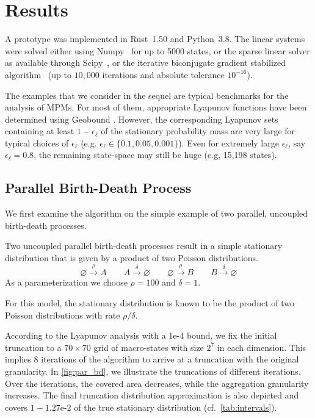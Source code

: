\section{Results}\label{sec:statagg:results}
A prototype was implemented in Rust~1.50 and Python~3.8.
The linear systems were solved either using Numpy~\cite{numpy} for up to 5000 states, or the sparse linear solver as available through Scipy~\cite{2020SciPy-NMeth}, or the iterative biconjugate gradient stabilized algorithm~\cite{van1992bi} (up to $10,\!000$ iterations and absolute tolerance $10^{-16}$).

The examples that we consider in the sequel 
are typical benchmarks for the analysis of \acp{MPM}. For most of them, appropriate Lyapunov functions
have been determined using Geobound \cite{spieler2014numerical}.
However, the corresponding Lyapunov sets containing at least $1-\epsilon_{\ell}$ of the stationary probability mass are very large for typical choices of $\epsilon_{\ell}$ (e.g. $\epsilon_{\ell}\in \{0.1,0.05,0.001\}$). Even
for extremely large $\epsilon_{\ell}$, say $\epsilon_{\ell}=0.8$, the remaining state-space may still be huge (e.g, 15,198 states).
\subsection{Parallel Birth-Death Process}
We first examine the algorithm on the simple example of two parallel, uncoupled birth-death processes.
\begin{model}\label{model:par_bd}
Two uncoupled parallel birth-death processes result in a simple stationary distribution that is
given by a product of two Poisson distributions.
$$\varnothing\xrightarrow{\rho} A \qquad A\xrightarrow{\delta} \varnothing \qquad
\varnothing\xrightarrow{\rho} B \qquad B\xrightarrow{\delta} \varnothing$$
As a parameterization we choose $\rho = 100$ and $\delta=1$.
\end{model}
For this model, the stationary distribution is known to be the product of two Poisson distributions with rate $\rho / \delta$.

According to the Lyapunov analysis with a 1e-4 bound, we fix the initial truncation to a $70\times 70$ grid of macro-states with size $2^7$ in each dimension.
This implies 8 iterations of the algorithm to arrive at a truncation with the original granularity.
In \autoref{fig:par_bd}, we illustrate the truncations of different iterations.
Over the iterations, the covered area decreases, while the aggregation granularity increases.
The final truncation distribution approximation is also depicted and covers $1 - \text{1.27e-2}$ of the true stationary distribution (cf.\ \autoref{tab:intervals}).

